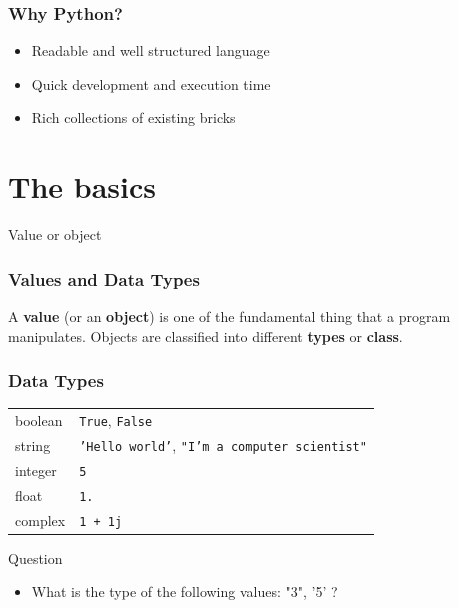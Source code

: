 \documentclass[xcolor=dvipsnames]{beamer}
\begin{document}
\begin{frame}
\frametitle{Why Python?}
\begin{itemize}
\item Readable and well structured language
\item Quick development and execution time
\item Rich collections of existing bricks
\end{itemize}
\end{frame}

\section{The basics}

\begin{frame}
\begin{block}{Value or object}
\frametitle{Values and Data Types}
A \textbf{value} (or an \textbf{object}) is one of the fundamental thing that
a program manipulates. Objects are classified into different \textbf{types} or
\textbf{class}.
\end{block}

\vspace{1em}

\end{frame}

\begin{frame}
\frametitle{Data Types}

\begin{tabular}{l | l}
boolean & \texttt{True}, \texttt{False} \\
string & \texttt{'Hello world'}, \texttt{"I'm a computer scientist"} \\
integer & \texttt{5} \\
float & \texttt{1.} \\ 
complex & \texttt{1 + 1j}
\end{tabular}

\vspace{1em}
\begin{alertblock}{Question}
\begin{itemize}
\item What is the type of the following values: "3", '5' ?
\end{itemize}
\end{alertblock}
\end{frame}
\end{document}
